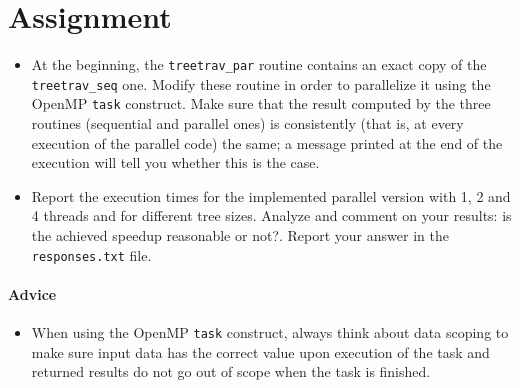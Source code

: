 \documentclass{article}
\begin{document}
\section{Assignment}
\begin{itemize}
\item {\huge \Keyboard} At the beginning, the \texttt{treetrav\_par}
  routine contains an exact copy of the \texttt{treetrav\_seq}
  one. Modify these routine in order to parallelize it using the
  OpenMP \texttt{task} construct.
  Make sure that the result computed by the three routines (sequential
  and parallel ones) is consistently (that is, at every execution of
  the parallel code) the same; a message printed at the end of the
  execution will tell you whether this is the case.
\item \smallpencil Report the execution times for the implemented
  parallel version with 1, 2 and 4 threads and for different tree
  sizes. Analyze and comment on your results: is the achieved speedup
  reasonable or not?. Report your answer in the \texttt{responses.txt}
  file.
\end{itemize}


\paragraph{Advice}
\begin{itemize}
\item When using the OpenMP \texttt{task} construct, always think
  about data scoping to make sure input data has the correct
  value upon execution of the task and returned results do not go out
  of scope when the task is finished.
\end{itemize}
\end{document}

